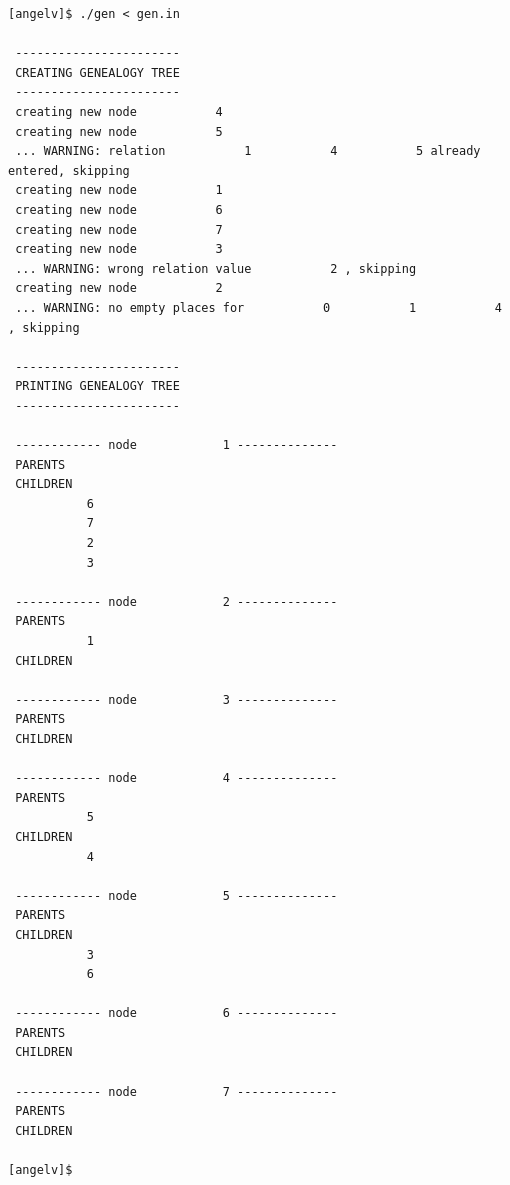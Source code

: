 \begin{verbatim}
[angelv]$ ./gen < gen.in
 
 -----------------------
 CREATING GENEALOGY TREE
 -----------------------
 creating new node           4
 creating new node           5
 ... WARNING: relation           1           4           5 already entered, skipping
 creating new node           1
 creating new node           6
 creating new node           7
 creating new node           3
 ... WARNING: wrong relation value           2 , skipping
 creating new node           2
 ... WARNING: no empty places for           0           1           4 , skipping
 
 -----------------------
 PRINTING GENEALOGY TREE
 -----------------------
 
 ------------ node            1 --------------
 PARENTS
 CHILDREN
           6
           7
           2
           3
 
 ------------ node            2 --------------
 PARENTS
           1
 CHILDREN
 
 ------------ node            3 --------------
 PARENTS
 CHILDREN
 
 ------------ node            4 --------------
 PARENTS
           5
 CHILDREN
           4
 
 ------------ node            5 --------------
 PARENTS
 CHILDREN
           3
           6
 
 ------------ node            6 --------------
 PARENTS
 CHILDREN
 
 ------------ node            7 --------------
 PARENTS
 CHILDREN

[angelv]$
\end{verbatim} 
